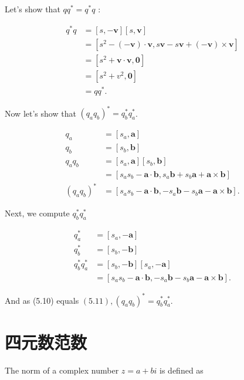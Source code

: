 Let's show that $q q^{*}=q^{*} q$ :

$$
\begin{aligned}
q^{*} q & =[s,-\mathbf{v}][s, \mathbf{v}] \\
& =\left[s^{2}-(-\mathbf{v}) \cdot \mathbf{v}, s \mathbf{v}-s \mathbf{v}+(-\mathbf{v}) \times \mathbf{v}\right] \\
& =\left[s^{2}+\mathbf{v} \cdot \mathbf{v}, \mathbf{0}\right] \\
& =\left[s^{2}+v^{2}, \mathbf{0}\right] \\
& =q q^{*} .
\end{aligned}
$$

Now let's show that $\left(q_{a} q_{b}\right)^{*}=q_{b}^{*} q_{a}^{*}$.

$$
\begin{aligned}
q_{a} & =\left[s_{a}, \mathbf{a}\right] \\
q_{b} & =\left[s_{b}, \mathbf{b}\right] \\
q_{a} q_{b} & =\left[s_{a}, \mathbf{a}\right]\left[s_{b}, \mathbf{b}\right] \\
& =\left[s_{a} s_{b}-\mathbf{a} \cdot \mathbf{b}, s_{a} \mathbf{b}+s_{b} \mathbf{a}+\mathbf{a} \times \mathbf{b}\right] \\
\left(q_{a} q_{b}\right)^{*} & =\left[s_{a} s_{b}-\mathbf{a} \cdot \mathbf{b},-s_{a} \mathbf{b}-s_{b} \mathbf{a}-\mathbf{a} \times \mathbf{b}\right] .
\end{aligned}
$$

Next, we compute $q_{b}^{*} q_{a}^{*}$

$$
\begin{aligned}
q_{a}^{*} & =\left[s_{a},-\mathbf{a}\right] \\
q_{b}^{*} & =\left[s_{b},-\mathbf{b}\right] \\
q_{b}^{*} q_{a}^{*} & =\left[s_{b},-\mathbf{b}\right]\left[s_{a},-\mathbf{a}\right] \\
& =\left[s_{a} s_{b}-\mathbf{a} \cdot \mathbf{b},-s_{a} \mathbf{b}-s_{b} \mathbf{a}-\mathbf{a} \times \mathbf{b}\right] .
\end{aligned}
$$

And as (5.10) equals $(5.11),\left(q_{a} q_{b}\right)^{*}=q_{b}^{*} q_{a}^{*}$.

\section{四元数范数}
The norm of a complex number $z=a+b i$ is defined as

